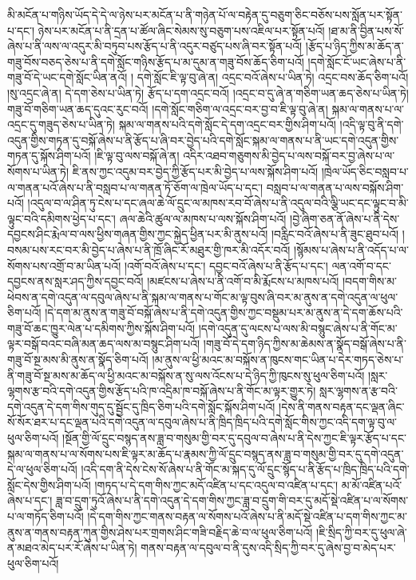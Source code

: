 མི་མངོན་པ་གཉིས་ཡོད་དེ་དེ་ལ་ཉེས་པར་མངོན་པ་ནི་གཉེན་པོ་ལ་བརྟེན་དུ་བཅུག་ཅིང་བཅོས་པས་སློན་པར་སྟོན་པ་དང་། ཉེས་པར་མངོན་པ་ནི་དྲན་པ་ཚོལ་ཞིང་སེམས་སུ་བཅུག་པས་འཇིལ་པར་སྟོན་པའོ། །ཐ་མ་ནི་བྱིན་པས་སོ་ཞེས་པ་ནི་ལས་ལ་འདུར་མི་བཏུབ་པས་རྩོད་པ་ནི་འདུར་བཙུད་པས་ཞི་བར་སྟོན་པའོ། །རྩོད་པ་ཉིད་ཀྱིས་མ་ཆོད་ན་གཟུ་བོས་བཅད་ཅེས་པ་ནི་དགེ་སློང་གཉིས་རྩོད་པ་མ་དུམ་ན་གཟུ་བོས་ཆོད་ཅིག་པའོ། །དགེ་སློང་ངོ་ཡང་ཞེས་པ་ནི་གཟུ་བོ་དེ་ཡང་དགེ་སློང་ཡིན་ནའོ། །
དགེ་སློང་ཇི་ལྟ་བུ་ཞེ་ན། འདྲང་བའོ་ཞེས་པ་ཡིན་ཏེ། འདྲང་བས་ཆོད་ཅིག་པའོ། །སུ་འདྲང་ཞེ་ན། དེ་དག་ཅེས་པ་ཡིན་ཏེ། རྩོད་པ་དག་འདྲང་བའོ། །འདྲང་བ་དུ་ཞེ་ན་གཅིག་ཡན་ཆད་ཅེས་པ་ཡིན་ཏེ། གཟུ་བོ་གཅིག་ཡན་ཆད་དུའང་རུང་བའོ། །དགེ་སློང་གཅིག་ལ་འདྲང་བར་བྱ་བ་ཇི་ལྟ་བུ་ཞེ་ན། སྐམ་ལ་གནས་པ་ལ་འདྲང་དུ་གཟུད་ཅེས་པ་ཡིན་ཏེ། སྐམ་ལ་གནས་པའི་དགེ་སློང་དེ་དག་འདྲང་བར་གྱིས་ཤིག་པའོ། །འདི་ལྟ་བུ་ནི་དགེ་འདུན་གྱིས་གཏན་དུ་བསྐོ་ཞེས་པ་ནི་རྩོད་པ་ཞི་བར་བྱེད་པའི་དགེ་སློང་སྐམ་ལ་གནས་པ་ནི་ཡང་དགེ་འདུན་གྱིས་གཏན་དུ་སྐོས་ཤིག་པའོ། །ཇི་ལྟ་བུ་ལས་བསྐོ་ཞེ་ན། འདིར་འཐབ་གཅུགས་མི་བྱེད་པ་ལས་བསྐོ་བར་བྱ་ཞེས་པ་ལ་སོགས་པ་ཡིན་ཏེ། ཇི་ནས་ཀྱང་འདུམ་བར་བྱེད་ཀྱི་རྩོད་པར་མི་བྱེད་པ་ལས་སྐོས་ཤིག་པའོ། །ཁྲེལ་ཡོད་ཅིང་བསླབ་པ་ལ་གནན་པའོ་ཞེས་པ་ནི་བསླབ་པ་ལ་གནན་ཏོ་ཅོག་ལ་ཁྲེལ་ཡོད་པ་དང་། བསླབ་པ་ལ་གནན་པ་ལས་བསྐོས་ཤིག་པའོ། །འདུལ་བ་ལ་ཤིན་ཏུ་ངེས་པ་དང་ཞལ་ཆེ་ལོ་དྲུང་ལ་མཁས་རབ་བོ་ཞེས་པ་ནི་འདུལ་བའི་ལྕི་ཡང་དང་ལྟུང་བ་མི་ལྟུང་བའི་དམིགས་ཕྱེད་པ་དང་། ཞལ་ཆེའི་ཚུལ་ལ་མཁས་པ་ལས་སྐོས་ཤིག་པའོ། །བྱེ་ཞིག་ཅན་ནོ་ཞེས་པ་ནི་དེས་དབྱངས་ཤིང་རྨེལ་བ་ལས་ཕྱིས་གཞན་གྱིས་ཀྱང་སྐྱེད་ཕྱིན་པར་མི་ནུས་པའོ། །བརླིང་བའོ་ཞེས་པ་ནི་ཟུང་ཐུབ་པའོ། །བསམ་པས་རང་བར་མི་བྱེད་པ་ཞེས་པ་ནི་ཁྲོ་ཞིང་རོ་མཐུར་གྱི་ཁར་མི་འདོར་བའོ། །སྙོམས་པ་ཞེས་པ་ནི་འདོད་པ་ལ་སོགས་པས་འགྲོ་བ་མ་ཡིན་པའོ། །འགོ་བའོ་ཞེས་པ་དང་། དབྱང་བའོ་ཞེས་པ་ནི་རྩོད་པ་དང་། ལན་འགོ་བ་དང་དབྱངས་ནས་སླར་ཤད་ཀྱིས་དབྱང་བའོ། །མཛངས་པ་ཞེས་པ་ནི་འགོ་བ་མི་རྨོངས་པ་མཁས་པའོ། །བདག་གིས་མ་ཕེབས་ན་དགེ་འདུན་ལ་དབུལ་ཞེས་པ་ནི་སྐམ་ལ་གནས་པ་གོང་མ་ལྟ་བུས་ཞི་བར་མ་ནུས་ན་དགེ་འདུན་ལ་ཕུལ་ཅིག་པའོ། །དེ་དག་མ་ནུས་ན་གཟུ་བོ་བསྐོ་ཞེས་པ་ནི་དགེ་འདུན་གྱིས་ཀྱང་བསྡུམ་པར་མ་ནུས་ན་དེ་དག་ཆོས་པའི་གཟུ་བོ་ཆང་ཁྱུར་ལེན་པ་དམིགས་ཀྱིས་སྐོས་ཤིག་པའོ། །དགེ་འདུན་དུ་ལངས་པ་ལས་མི་བསྙུང་ཞེས་པ་ནི་གོང་མ་ལྟར་བསྒོ་བའང་བཞི་མན་ཆད་ལས་མ་བསྙུང་ཤིག་པའོ། །གཟུ་བོ་དེ་དག་ཉིད་ཀྱིས་མ་ཆེམས་ན་སྣོད་བསྒོ་ཞེས་པ་ནི་གཟུ་བོ་སྔ་མས་མི་ནུས་ན་སྣོད་ཅིག་པའོ། །མ་ནུས་ལ་ཕྱི་མའང་མ་བསྐོས་ན་ཁུངས་གང་ཡིན་པ་དེར་གཏད་ཅེས་པ་ནི་གཟུ་བོ་སྔ་མས་མ་ཆོད་ལ་ཕྱི་མའང་མ་བསྐོས་ན་སུ་ལས་འོངས་པ་དེ་ཉིད་ཀྱི་ཁུངས་སུ་ཕུལ་ཅིག་པའོ། །སླར་ལྷགས་རྩ་བའི་དགེ་འདུན་གྱིས་རྩོད་པའི་ཁ་འདྲིམ་ཁ་བསྐོ་ཞེས་པ་ནི་གོང་མ་ལྟར་གྱུར་ཏེ། སླར་ལྷགས་ན་རྩ་བའི་དགེ་འདུན་དེ་དག་གིས་གུད་དུ་སྦྱོང་དུ་ཁྲིད་ཅིག་པའི་དགེ་སློང་སྐོས་ཤིག་པའོ། །དེས་ནི་གནས་བརྟན་དང་ལྡན་ཞིང་སོ་སོར་ཐར་པ་དང་ལྡན་པའི་དགེ་འདུན་ལ་དབུལ་ཞེས་པ་ནི་ཁྲིད་ཁྲིད་པའི་དགེ་སློང་གིས་ཀྱང་འདི་དག་ལྟ་བུ་ལ་ཕུལ་ཅིག་པའོ། །སྔོན་གྱི་ལོ་དྲུང་བསྙད་ནས་ཟླ་བ་གསུམ་གྱི་བར་དུ་དབུལ་བ་ཞེས་པ་ནི་དེས་ཀྱང་ཇི་ལྟར་རྩོད་པ་དང་སྐམ་ལ་གནས་པ་ལ་སོགས་པས་ཇི་ལྟར་མ་ཆོད་པ་རྣམས་ཀྱི་ལོ་དྲུང་བསྙད་ནས་ཟླ་བ་གསུམ་གྱི་བར་དུ་དགེ་འདུན་དེ་ལ་ཕུལ་ཅིག་པའོ། །འདི་དག་ནི་དེས་ངེས་སོ་ཞེས་པ་ནི་གོང་མ་སྐད་དུ་ལོ་དྲུང་སྙོད་པ་ནི་རྩོད་པ་ཁྲིད་ཁྲིད་པའི་དགེ་སློང་དེས་གྱིས་ཤིག་པའོ། །གཏད་པ་དེ་དག་གིས་ཀྱང་མདོ་འཛིན་པ་དང་འདུལ་བ་འཛིན་པ་དང་། མ་མོ་འཛིན་པའོ་ཞེས་པ་དང་། ཟླ་བ་དྲུག་ཏུའོ་ཞེས་པ་ནི་དགེ་འདུན་དེ་དག་གིས་ཀྱང་ཟླ་བ་དྲུག་གི་བར་དུ་མདོ་སྡེ་འཛིན་པ་ལ་སོགས་པ་ལ་གཏོད་ཅིག་པའོ། །དེ་དག་གིས་ཀྱང་གནས་བརྟན་ལ་སོགས་པའོ་ཞེས་པ་ནི་མདོ་སྡེ་འཛིན་པ་དག་གིས་ཀྱང་མ་ནུས་ན་གནས་བརྟན་ཀུན་གྱིས་ཤེས་པར་གྲགས་ཤིང་གཟི་བརྗིད་ཆེ་བ་ལ་ཕུལ་ཅིག་པའོ། །ཇི་སྲིད་ཀྱི་བར་དུ་ཕུལ་ཞེ་ན་མཐའ་མེད་པར་རོ་ཞེས་པ་ཡིན་ཏེ། གནས་བརྟན་ལ་དབུལ་བ་ནི་དུས་འདི་སྲིད་ཀྱི་བར་དུ་ཞེས་བྱ་བ་མེད་པར་ཕུལ་ཅིག་པའོ། 